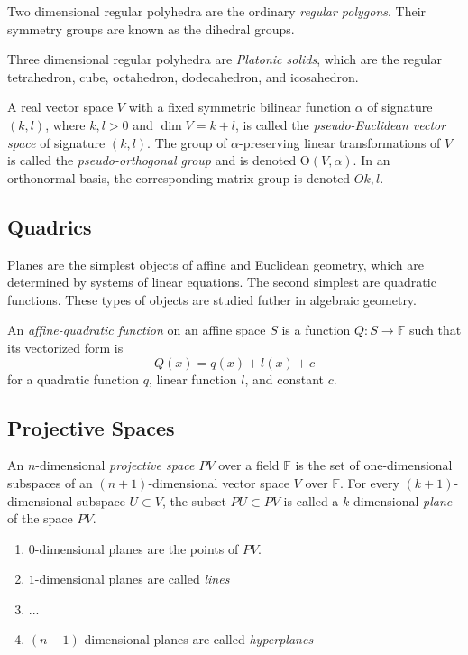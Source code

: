 \documentclass{article}
\begin{document}
    Two dimensional regular polyhedra are the ordinary \textit{regular polygons}. Their symmetry groups are known as the dihedral groups.

    Three dimensional regular polyhedra are \textit{Platonic solids}, which are the regular tetrahedron, cube, octahedron, dodecahedron, and icosahedron. 

    \begin{definition}
    A real vector space $V$ with a fixed symmetric bilinear function $\alpha$ of signature $(k, l)$, where $k, l > 0$ and $\dim{V} = k+l$, is called the \textit{pseudo-Euclidean vector space} of signature $(k, l)$. The group of $\alpha$-preserving linear transformations of $V$ is called the \textit{pseudo-orthogonal group} and is denoted O$(V, \alpha)$. In an orthonormal basis, the corresponding matrix group is denoted $O{k,l}$. 
    \end{definition}

  \subsection{Quadrics}

    Planes are the simplest objects of affine and Euclidean geometry, which are determined by systems of linear equations. The second simplest are quadratic functions. These types of objects are studied futher in algebraic geometry. 

    \begin{definition}
    An \textit{affine-quadratic function} on an affine space $S$ is a function $Q: S \longrightarrow \mathbb{F}$ such that its vectorized form is
    \[Q(x) = q(x) + l(x) + c\]
    for a quadratic function $q$, linear function $l$, and constant $c$. 
    \end{definition}

  \subsection{Projective Spaces}

    \begin{definition}
    An $n$-dimensional \textit{projective space $PV$} over a field $\mathbb{F}$ is the set of one-dimensional subspaces of an $(n+1)$-dimensional vector space $V$ over $\mathbb{F}$. For every $(k+1)$-dimensional subspace $U \subset V$, the subset $PU \subset PV$ is called a $k$-dimensional \textit{plane} of the space $PV$. 
    \begin{enumerate}
        \item $0$-dimensional planes are the points of $PV$. 
        \item $1$-dimensional planes are called \textit{lines}
        \item ...
        \item $(n-1)$-dimensional planes are called \textit{hyperplanes}
    \end{enumerate}
    \end{definition}
\end{document}
